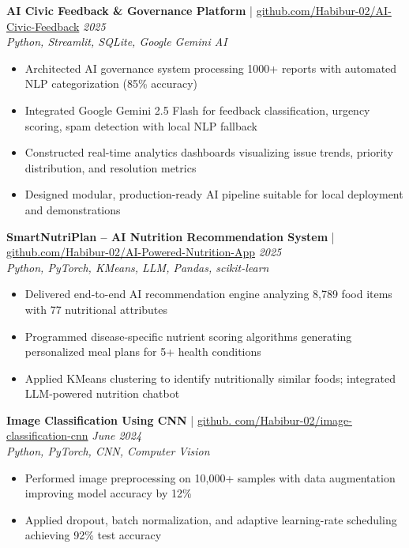 \textbf{AI Civic Feedback \& Governance Platform} | \href{https://github.com/Habibur-02/AI-Civic-Feedback}{github.com/Habibur-02/AI-Civic-Feedback} \hfill \textit{2025}\\
\textit{Python, Streamlit, SQLite, Google Gemini AI}
\vspace{-2pt}
\begin{itemize}[itemsep=0.5pt]
    \item Architected AI governance system processing 1000+ reports with automated NLP categorization (85\% accuracy)
    \item Integrated Google Gemini 2.5 Flash for feedback classification, urgency scoring, spam detection with local NLP fallback
    \item Constructed real-time analytics dashboards visualizing issue trends, priority distribution, and resolution metrics
    \item Designed modular, production-ready AI pipeline suitable for local deployment and demonstrations
\end{itemize}
\vspace{1pt}

\textbf{SmartNutriPlan -- AI Nutrition Recommendation System} | \href{https://github.com/Habibur-02/AI-Powered-Nutrition-App}{github.com/Habibur-02/AI-Powered-Nutrition-App} \hfill \textit{2025}\\
\textit{Python, PyTorch, KMeans, LLM, Pandas, scikit-learn}
\vspace{-2pt}
\begin{itemize}[itemsep=0.5pt]
    \item Delivered end-to-end AI recommendation engine analyzing 8,789 food items with 77 nutritional attributes
    \item Programmed disease-specific nutrient scoring algorithms generating personalized meal plans for 5+ health conditions
    \item Applied KMeans clustering to identify nutritionally similar foods; integrated LLM-powered nutrition chatbot
\end{itemize}
\vspace{1pt}

\textbf{Image Classification Using CNN} | \href{https://github.com/Habibur-02/image-classification-cnn}{github. com/Habibur-02/image-classification-cnn} \hfill \textit{June 2024}\\
\textit{Python, PyTorch, CNN, Computer Vision}
\vspace{-2pt}
\begin{itemize}[itemsep=0.5pt]
    \item Performed image preprocessing on 10,000+ samples with data augmentation improving model accuracy by 12\%
    \item Applied dropout, batch normalization, and adaptive learning-rate scheduling achieving 92\% test accuracy
\end{itemize}
\vspace{1pt}


